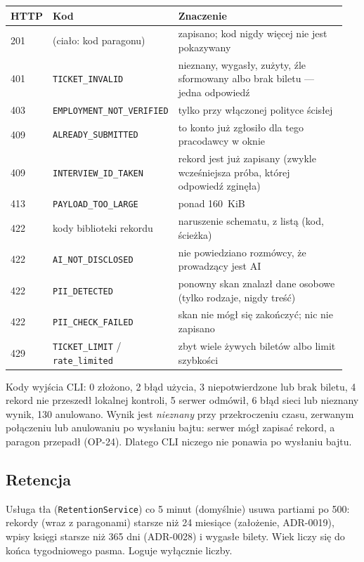 \begin{longtable}{@{}p{0.1\linewidth}p{0.3\linewidth}p{0.55\linewidth}@{}}
\toprule
HTTP & Kod & Znaczenie \\
\midrule
\endhead
201 & (ciało: kod paragonu) & zapisano; kod nigdy więcej nie jest pokazywany \\
401 & \texttt{TICKET\_INVALID} & nieznany, wygasły, zużyty, źle sformowany albo brak biletu --- jedna odpowiedź \\
403 & \texttt{EMPLOYMENT\_NOT\_VERIFIED} & tylko przy włączonej polityce ścisłej \\
409 & \texttt{ALREADY\_SUBMITTED} & to konto już zgłosiło dla tego pracodawcy w oknie \\
409 & \texttt{INTERVIEW\_ID\_TAKEN} & rekord jest już zapisany (zwykle wcześniejsza próba, której odpowiedź zginęła) \\
413 & \texttt{PAYLOAD\_TOO\_LARGE} & ponad 160~KiB \\
422 & kody biblioteki rekordu & naruszenie schematu, z listą (kod, ścieżka) \\
422 & \texttt{AI\_NOT\_DISCLOSED} & nie powiedziano rozmówcy, że prowadzący jest AI \\
422 & \texttt{PII\_DETECTED} & ponowny skan znalazł dane osobowe (tylko rodzaje, nigdy treść) \\
422 & \texttt{PII\_CHECK\_FAILED} & skan nie mógł się zakończyć; nic nie zapisano \\
429 & \texttt{TICKET\_LIMIT} / \texttt{rate\_limited} & zbyt wiele żywych biletów albo limit szybkości \\
\bottomrule
\end{longtable}

Kody wyjścia CLI: 0 złożono, 2 błąd użycia, 3 niepotwierdzone lub brak biletu,
4 rekord nie przeszedł lokalnej kontroli, 5 serwer odmówił, 6 błąd sieci lub
nieznany wynik, 130 anulowano. Wynik jest \emph{nieznany} przy przekroczeniu
czasu, zerwanym połączeniu lub anulowaniu po wysłaniu bajtu: serwer mógł
zapisać rekord, a paragon przepadł (OP-24). Dlatego CLI niczego nie ponawia po
wysłaniu bajtu.

\subsection{Retencja}

Usługa tła (\texttt{RetentionService}) co 5 minut (domyślnie) usuwa partiami po
500: rekordy (wraz z paragonami) starsze niż 24 miesiące (założenie, ADR-0019),
wpisy księgi starsze niż 365 dni (ADR-0028) i wygasłe bilety. Wiek liczy się do
końca tygodniowego pasma. Loguje wyłącznie liczby.

